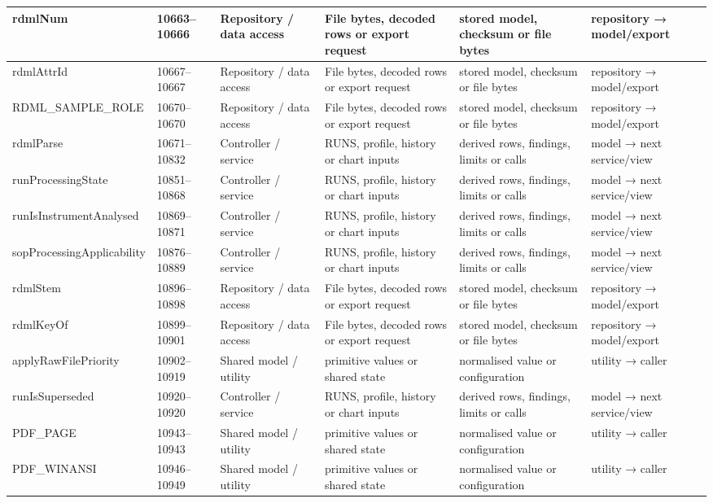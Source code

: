 \begin{landscape}
\begin{longtable}{@{}p{3.2cm}p{1.45cm}p{2.7cm}p{4.0cm}p{4.0cm}p{3.0cm}@{}}
rdmlNum & 10663--10666 & Repository / data access & File bytes, decoded rows or export request & stored model, checksum or file bytes & repository → model/export \\\hline
rdmlAttrId & 10667--10667 & Repository / data access & File bytes, decoded rows or export request & stored model, checksum or file bytes & repository → model/export \\\hline
RDML\_SAMPLE\_ROLE & 10670--10670 & Repository / data access & File bytes, decoded rows or export request & stored model, checksum or file bytes & repository → model/export \\\hline
rdmlParse & 10671--10832 & Controller / service & RUNS, profile, history or chart inputs & derived rows, findings, limits or calls & model → next service/view \\\hline
runProcessingState & 10851--10868 & Controller / service & RUNS, profile, history or chart inputs & derived rows, findings, limits or calls & model → next service/view \\\hline
runIsInstrumentAnalysed & 10869--10871 & Controller / service & RUNS, profile, history or chart inputs & derived rows, findings, limits or calls & model → next service/view \\\hline
sopProcessingApplicability & 10876--10889 & Controller / service & RUNS, profile, history or chart inputs & derived rows, findings, limits or calls & model → next service/view \\\hline
rdmlStem & 10896--10898 & Repository / data access & File bytes, decoded rows or export request & stored model, checksum or file bytes & repository → model/export \\\hline
rdmlKeyOf & 10899--10901 & Repository / data access & File bytes, decoded rows or export request & stored model, checksum or file bytes & repository → model/export \\\hline
applyRawFilePriority & 10902--10919 & Shared model / utility & primitive values or shared state & normalised value or configuration & utility → caller \\\hline
runIsSuperseded & 10920--10920 & Controller / service & RUNS, profile, history or chart inputs & derived rows, findings, limits or calls & model → next service/view \\\hline
PDF\_PAGE & 10943--10943 & Shared model / utility & primitive values or shared state & normalised value or configuration & utility → caller \\\hline
PDF\_WINANSI & 10946--10949 & Shared model / utility & primitive values or shared state & normalised value or configuration & utility → caller \\\hline

\end{longtable}
\end{landscape}
